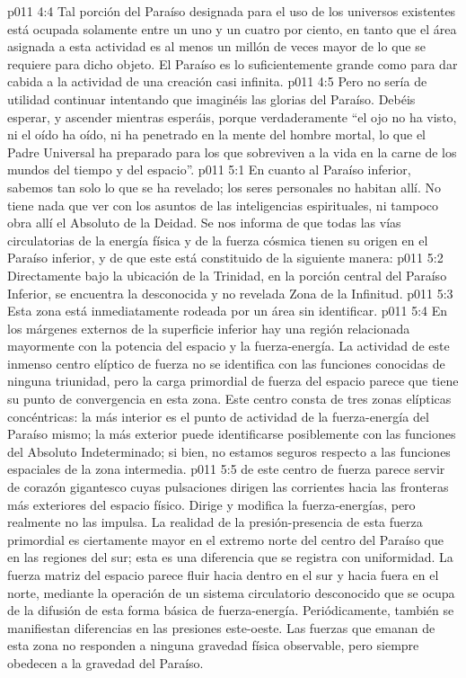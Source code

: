 \vs p011 4:4 Tal porción del Paraíso designada para el uso de los universos existentes está ocupada solamente entre un uno y un cuatro por ciento, en tanto que el área asignada a esta actividad es al menos un millón de veces mayor de lo que se requiere para dicho objeto. El Paraíso es lo suficientemente grande como para dar cabida a la actividad de una creación casi infinita.
\vs p011 4:5 Pero no sería de utilidad continuar intentando que imaginéis las glorias del Paraíso. Debéis esperar, y ascender mientras esperáis, porque verdaderamente “el ojo no ha visto, ni el oído ha oído, ni ha penetrado en la mente del hombre mortal, lo que el Padre Universal ha preparado para los que sobreviven a la vida en la carne de los mundos del tiempo y del espacio”.
\vs p011 5:1 En cuanto al Paraíso inferior, sabemos tan solo lo que se ha revelado; los seres personales no habitan allí. No tiene nada que ver con los asuntos de las inteligencias espirituales, ni tampoco obra allí el Absoluto de la Deidad. Se nos informa de que todas las vías circulatorias de la energía física y de la fuerza cósmica tienen su origen en el Paraíso inferior, y de que este está constituido de la siguiente manera:
\vs p011 5:2 Directamente bajo la ubicación de la Trinidad, en la porción central del Paraíso Inferior, se encuentra la desconocida y no revelada Zona de la Infinitud.
\vs p011 5:3 Esta zona está inmediatamente rodeada por un área sin identificar.
\vs p011 5:4 En los márgenes externos de la superficie inferior hay una región relacionada mayormente con la potencia del espacio y la fuerza\hyp{}energía. La actividad de este inmenso centro elíptico de fuerza no se identifica con las funciones conocidas de ninguna triunidad, pero la carga primordial de fuerza del espacio parece que tiene su punto de convergencia en esta zona. Este centro consta de tres zonas elípticas concéntricas: la más interior es el punto de actividad de la fuerza\hyp{}energía del Paraíso mismo; la más exterior puede identificarse posiblemente con las funciones del Absoluto Indeterminado; si bien, no estamos seguros respecto a las funciones espaciales de la zona intermedia.
\vs p011 5:5 \pc {} de este centro de fuerza parece servir de corazón gigantesco cuyas pulsaciones dirigen las corrientes hacia las fronteras más exteriores del espacio físico. Dirige y modifica la fuerza\hyp{}energías, pero realmente no las impulsa. La realidad de la presión\hyp{}presencia de esta fuerza primordial es ciertamente mayor en el extremo norte del centro del Paraíso que en las regiones del sur; esta es una diferencia que se registra con uniformidad. La fuerza matriz del espacio parece fluir hacia dentro en el sur y hacia fuera en el norte, mediante la operación de un sistema circulatorio desconocido que se ocupa de la difusión de esta forma básica de fuerza\hyp{}energía. Periódicamente, también se manifiestan diferencias en las presiones este\hyp{}oeste. Las fuerzas que emanan de esta zona no responden a ninguna gravedad física observable, pero siempre obedecen a la gravedad del Paraíso.

